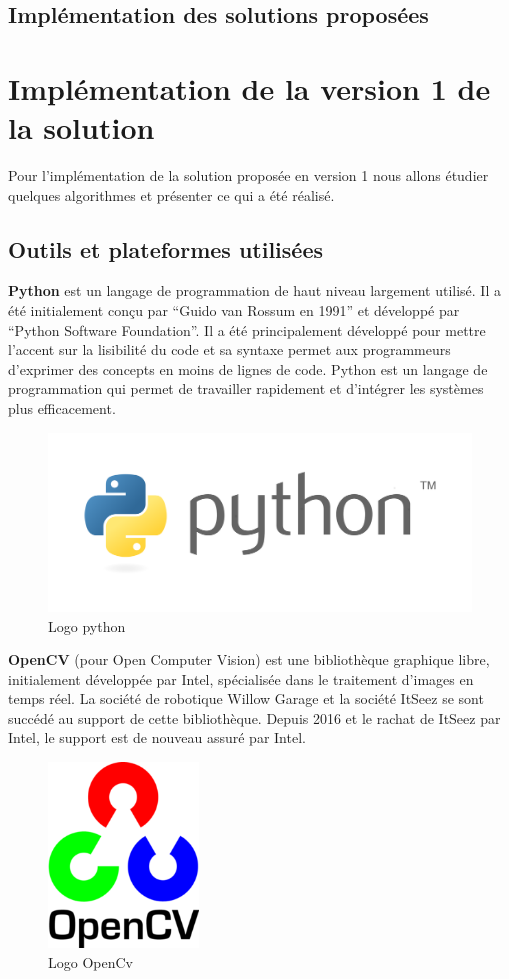 \documentclass[12pt]{article}
\begin{document}
\subsection*{\huge{Implémentation des solutions proposées}}
\newpage
{}
\section{Implémentation de la version 1 de la solution}
Pour l'implémentation de la solution proposée en version 1 nous allons étudier quelques algorithmes et présenter ce qui a été réalisé.

\subsection{Outils et plateformes utilisées}
\textbf{Python} est un langage de programmation de haut niveau largement utilisé. Il a été initialement conçu par “Guido van Rossum en 1991” et développé par “Python Software Foundation”. Il a été principalement développé pour mettre l'accent sur la lisibilité du code et sa syntaxe permet aux programmeurs d'exprimer des concepts en moins de lignes de code. Python est un langage de programmation qui permet de travailler rapidement et d’intégrer les systèmes plus efficacement.

\begin{figure}[h]
	\centering
	\includegraphics[width=12cm]{img-Chapiter-4/Python_logo.png}
	\caption{Logo python}
\end{figure}

\textbf{OpenCV} (pour Open Computer Vision) est une bibliothèque graphique libre, initialement développée par Intel, spécialisée dans le traitement d'images en temps réel. La société de robotique Willow Garage et la société ItSeez se sont succédé au support de cette bibliothèque. Depuis 2016 et le rachat de ItSeez par Intel, le support est de nouveau assuré par Intel. 
\newpage
\begin{figure}[h]
	\centering
	\includegraphics[width=4cm]{img-Chapiter-4/open.png}
	\caption{Logo OpenCv}
\end{figure}
\end{document}
